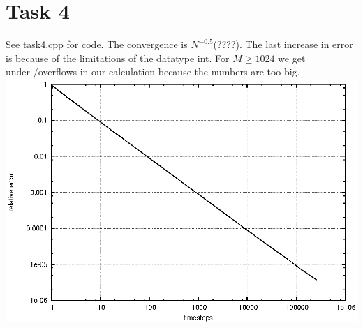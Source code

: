 \documentclass[]{article}
\begin{document}
\section*{Task 4}
See task4.cpp for code. The convergence is $N^{-0.5}$(????). The last increase in error is because of the limitations of the datatype int. For $M\ge 1024$ we get under-/overflows in our calculation because the numbers are too big.
\\
\includegraphics{task4.eps}\\
\end{document}
